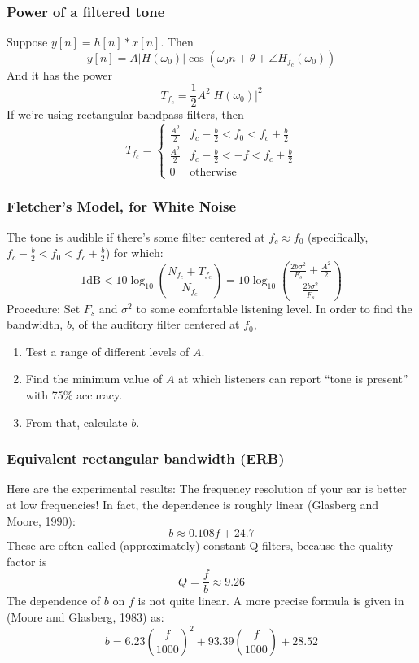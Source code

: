 \documentclass{beamer}
\begin{document}
\begin{frame}
  \frametitle{Power of a filtered tone}

  Suppose $y[n]=h[n]\ast x[n]$.  Then
  \[
  y[n] = A|H(\omega_0)|\cos\left(\omega_0 n+\theta+\angle H_{f_c}(\omega_0)\right)
  \]
  And it has the power
  \[
  T_{f_c} = \frac{1}{2}A^2 |H(\omega_0)|^2
  \]
  If we're using rectangular bandpass filters, then
  \[
  T_{f_c} = \begin{cases}
    \frac{A^2}{2} & f_c-\frac{b}{2}< f_0 <f_c+\frac{b}{2}\\
    \frac{A^2}{2} & f_c-\frac{b}{2} < -f < f_c+\frac{b}{2} \\
    0 & \mbox{otherwise}
  \end{cases}
  \]
\end{frame}

\begin{frame}
  \frametitle{Fletcher's Model, for White Noise}

  The tone is audible if there's some filter centered at $f_c\approx f_0$ (specifically,
  $f_c-\frac{b}{2}< f_0 <f_c+\frac{b}{2}$)  for which:
  \[
  1\mbox{dB} < 10\log_{10}\left(\frac{N_{f_c}+T_{f_c}}{N_{f_c}}\right)
  = 10\log_{10}\left(\frac{\frac{2b\sigma^2}{F_s}+\frac{A^2}{2}}{\frac{2b\sigma^2}{F_s}}\right)
  \]
  Procedure: Set $F_s$ and $\sigma^2$ to some comfortable listening
  level.  In order to find the bandwidth, $b$, of the auditory filter centered at $f_0$,
  \begin{enumerate}
  \item Test a range of different levels of $A$.
  \item Find the minimum value of $A$ at which listeners can report
    ``tone is present'' with 75\% accuracy.
  \item From that, calculate $b$.
  \end{enumerate}
\end{frame}

\begin{frame}
  \frametitle{Equivalent rectangular bandwidth (ERB)}

  Here are the experimental results: The frequency resolution of your
  ear is better at low frequencies!  In fact, the dependence is
  roughly linear (Glasberg and Moore, 1990):
  \[
  b \approx 0.108 f + 24.7
  \]
  These are often called (approximately) constant-Q filters, because
  the quality factor is
  \[
  Q = \frac{f}{b} \approx 9.26
  \]
  The dependence of $b$ on $f$ is not quite linear.  A more precise
  formula is given in (Moore and Glasberg, 1983) as:
  \[
  b = 6.23\left(\frac{f}{1000}\right)^2 + 93.39\left(\frac{f}{1000}\right)+28.52
  \]
\end{frame}
\end{document}
